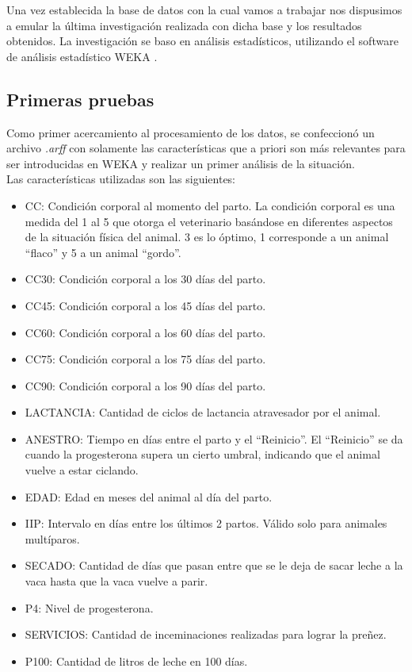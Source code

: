 \documentclass[11pt,a4paper]{article}
\begin{document}
Una vez establecida la base de datos con la cual vamos a trabajar nos dispusimos a emular la última investigación realizada con dicha base y los resultados obtenidos. La investigación se baso en análisis estadísticos, utilizando el software de análisis estadístico WEKA \cite{bib:weka}.

\subsection{Primeras pruebas}
Como primer acercamiento al procesamiento de los datos, se confeccionó un archivo \emph{.arff} con solamente las características que a priori son más relevantes para ser introducidas en WEKA y realizar un primer análisis de la situación.\\

Las características utilizadas son las siguientes:
\begin{itemize}
	\item CC: Condición corporal al momento del parto. La condición corporal es una medida del 1 al 5 que otorga el veterinario basándose en diferentes aspectos de la situación física del animal. 3 es lo óptimo, 1 corresponde a un animal ``flaco'' y 5 a un animal ``gordo''.
	\item CC30: Condición corporal a los 30 días del parto.
	\item CC45: Condición corporal a los 45 días del parto.
	\item CC60: Condición corporal a los 60 días del parto.
	\item CC75: Condición corporal a los 75 días del parto.
	\item CC90: Condición corporal a los 90 días del parto.
	\item LACTANCIA: Cantidad de ciclos de lactancia atravesador por el animal.
	\item ANESTRO: Tiempo en días entre el parto y el ``Reinicio''. El ``Reinicio'' se da cuando la progesterona supera un cierto umbral, indicando que el animal vuelve a estar ciclando.
	\item EDAD: Edad en meses del animal al día del parto.
	\item IIP: Intervalo en días entre los últimos 2 partos. Válido solo para animales multíparos.
	\item SECADO: Cantidad de días que pasan entre que se le deja de sacar leche a la vaca hasta que la vaca vuelve a parir.
	\item P4: Nivel de progesterona.
	\item SERVICIOS: Cantidad de inceminaciones realizadas para lograr la preñez.
	\item P100: Cantidad de litros de leche en 100 días.
\end{itemize}
\end{document}
